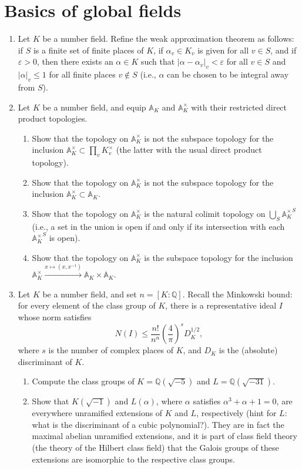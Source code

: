 \documentclass[11pt,answers,addpoints,reqno]{exam}
\theoremstyle{definition}
\theoremstyle{remark}
\theoremstyle{definition}
\theoremstyle{remark}
\theoremstyle{remark}
\theoremstyle{remark}
\newcommand{\Q}{\mathbb{Q}}
\newcommand{\adele}{\mathbb{A}}
\newcommand{\idele}{\mathbb{A}^\times}
\begin{document}
\section{Basics of global fields}
\begin{enumerate}
\item Let $K$ be a number field. Refine the weak approximation theorem as follows: if $S$ is a finite set of finite places of $K$, if $\alpha_v \in K_v$ is given for all $v \in S$, and if $\varepsilon > 0$, then there exists an $\alpha \in K$ such that $|\alpha-\alpha_v|_v < \varepsilon$ for all $v \in S$ and $|\alpha|_v \leq 1$ for all finite places $v \not \in S$ (i.e., $\alpha$ can be chosen to be integral away from $S$).
\item Let $K$ be a number field, and equip $\adele_K$ and $\idele_K$ with their restricted direct product topologies. \begin{enumerate}
\item Show that the topology on $\idele_K$ is not the subspace topology for the inclusion $\idele_K \subset \prod_v K_v^{\times}$ (the latter with the usual direct product topology). 
\item Show that the topology on $\idele_K$ is not the subspace topology for the inclusion $\idele_K \subset \adele_K$. 
\item Show that the topology on $\idele_K$ is the natural colimit topology on $\bigcup_S {\idele_K}^S$ (i.e., a set in the union is open if and only if its intersection with each ${\idele_K}^S$ is open).
\item Show that the topology on $\idele_K$ is the subspace topology for the inclusion $\idele_K \xrightarrow{x \mapsto (x, x^{-1})} \adele_K \times \adele_K$.
\end{enumerate}
\item Let $K$ be a number field, and set $n= [K:\Q]$. Recall the Minkowski bound: for every element of the class group of $K$, there is a representative ideal $I$ whose norm satisfies
\[
N(I) \leq \frac{n!}{n^n} \left( \frac{4}{\pi} \right)^s D_K^{1/2},
\]
where $s$ is the number of complex places of $K$, and $D_K$ is the (absolute) discriminant of $K$. 
\begin{enumerate}
\item Compute the class groups of $K=\Q(\sqrt{-5})$ and $L=\Q(\sqrt{-31})$.
\item Show that $K(\sqrt{-1})$ and $L(\alpha)$, where $\alpha$ satisfies $\alpha^3+\alpha+1=0$, are everywhere unramified extensions of $K$ and $L$, respectively (hint for $L$: what is the discriminant of a cubic polynomial?). They are in fact the maximal abelian unramified extensions, and it is part of class field theory (the theory of the Hilbert class field) that the Galois groups of these extensions are isomorphic to the respective class groups.

\end{enumerate}
\end{enumerate}
\end{document}
